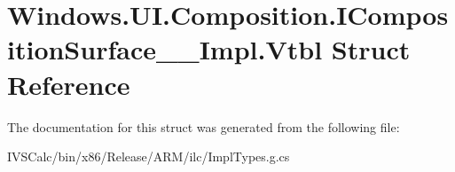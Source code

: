 \hypertarget{struct_windows_1_1_u_i_1_1_composition_1_1_i_composition_surface_____impl_1_1_vtbl}{}\section{Windows.\+U\+I.\+Composition.\+I\+Composition\+Surface\+\_\+\+\_\+\+Impl.\+Vtbl Struct Reference}
\label{struct_windows_1_1_u_i_1_1_composition_1_1_i_composition_surface_____impl_1_1_vtbl}


The documentation for this struct was generated from the following file\+:\begin{DoxyCompactItemize}
\item 
I\+V\+S\+Calc/bin/x86/\+Release/\+A\+R\+M/ilc/Impl\+Types.\+g.\+cs\end{DoxyCompactItemize}
